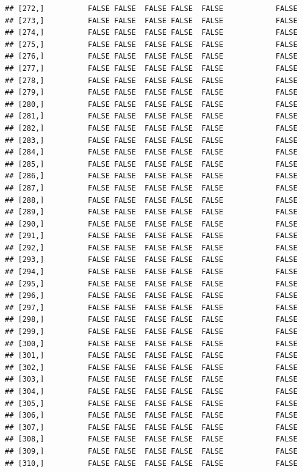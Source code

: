 \documentclass[
  english,
  man,floatsintext]{apa6}
\begin{document}
\begin{verbatim}
## [272,]          FALSE FALSE  FALSE FALSE  FALSE            FALSE
## [273,]          FALSE FALSE  FALSE FALSE  FALSE            FALSE
## [274,]          FALSE FALSE  FALSE FALSE  FALSE            FALSE
## [275,]          FALSE FALSE  FALSE FALSE  FALSE            FALSE
## [276,]          FALSE FALSE  FALSE FALSE  FALSE            FALSE
## [277,]          FALSE FALSE  FALSE FALSE  FALSE            FALSE
## [278,]          FALSE FALSE  FALSE FALSE  FALSE            FALSE
## [279,]          FALSE FALSE  FALSE FALSE  FALSE            FALSE
## [280,]          FALSE FALSE  FALSE FALSE  FALSE            FALSE
## [281,]          FALSE FALSE  FALSE FALSE  FALSE            FALSE
## [282,]          FALSE FALSE  FALSE FALSE  FALSE            FALSE
## [283,]          FALSE FALSE  FALSE FALSE  FALSE            FALSE
## [284,]          FALSE FALSE  FALSE FALSE  FALSE            FALSE
## [285,]          FALSE FALSE  FALSE FALSE  FALSE            FALSE
## [286,]          FALSE FALSE  FALSE FALSE  FALSE            FALSE
## [287,]          FALSE FALSE  FALSE FALSE  FALSE            FALSE
## [288,]          FALSE FALSE  FALSE FALSE  FALSE            FALSE
## [289,]          FALSE FALSE  FALSE FALSE  FALSE            FALSE
## [290,]          FALSE FALSE  FALSE FALSE  FALSE            FALSE
## [291,]          FALSE FALSE  FALSE FALSE  FALSE            FALSE
## [292,]          FALSE FALSE  FALSE FALSE  FALSE            FALSE
## [293,]          FALSE FALSE  FALSE FALSE  FALSE            FALSE
## [294,]          FALSE FALSE  FALSE FALSE  FALSE            FALSE
## [295,]          FALSE FALSE  FALSE FALSE  FALSE            FALSE
## [296,]          FALSE FALSE  FALSE FALSE  FALSE            FALSE
## [297,]          FALSE FALSE  FALSE FALSE  FALSE            FALSE
## [298,]          FALSE FALSE  FALSE FALSE  FALSE            FALSE
## [299,]          FALSE FALSE  FALSE FALSE  FALSE            FALSE
## [300,]          FALSE FALSE  FALSE FALSE  FALSE            FALSE
## [301,]          FALSE FALSE  FALSE FALSE  FALSE            FALSE
## [302,]          FALSE FALSE  FALSE FALSE  FALSE            FALSE
## [303,]          FALSE FALSE  FALSE FALSE  FALSE            FALSE
## [304,]          FALSE FALSE  FALSE FALSE  FALSE            FALSE
## [305,]          FALSE FALSE  FALSE FALSE  FALSE            FALSE
## [306,]          FALSE FALSE  FALSE FALSE  FALSE            FALSE
## [307,]          FALSE FALSE  FALSE FALSE  FALSE            FALSE
## [308,]          FALSE FALSE  FALSE FALSE  FALSE            FALSE
## [309,]          FALSE FALSE  FALSE FALSE  FALSE            FALSE
## [310,]          FALSE FALSE  FALSE FALSE  FALSE            FALSE

\end{verbatim}
\end{document}
